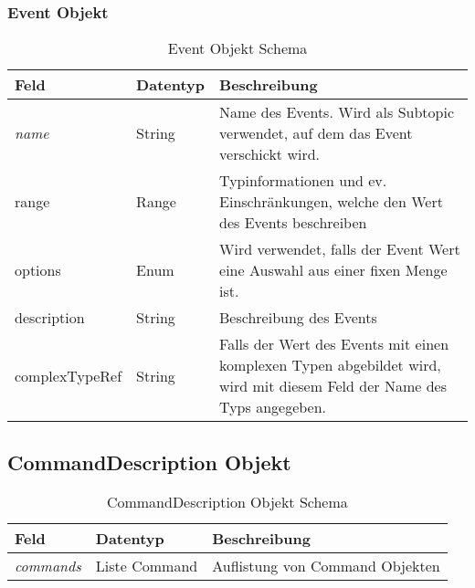 \subsubsection{Event Objekt}
\begin{table}[H]
\begin{tabularx}{\textwidth}{|l|l|X|}

 \hline \rowcolor{lightgray}
 {\bf Feld } & {\bf Datentyp } & {\bf Beschreibung } \\  \hline
 
 \textit{name}  &   String   &  Name des Events. Wird als Subtopic verwendet, auf dem das Event verschickt wird. \\ \hline
 range  &   Range   &  Typinformationen und ev. Einschränkungen, welche den Wert des Events beschreiben   \\ \hline
 options  &   Enum   &  Wird verwendet, falls der Event Wert eine Auswahl aus einer fixen Menge ist.  \\ \hline
 description  &   String   &  Beschreibung des Events  \\ \hline
 complexTypeRef  &   String   &  Falls der Wert des Events mit einen komplexen Typen abgebildet wird, wird mit diesem Feld der Name des Typs angegeben.  \\ \hline

\end{tabularx}
\caption{Event Objekt Schema}
\end{table}



\subsection{CommandDescription Objekt}
\begin{table}[H]
\begin{tabularx}{\textwidth}{|l|l|X|}

 \hline \rowcolor{lightgray}
 {\bf Feld } & {\bf Datentyp } & {\bf Beschreibung } \\  \hline
 \textit{commands}  &   Liste Command   & Auflistung von Command Objekten   \\ \hline

\end{tabularx}
\caption{CommandDescription Objekt Schema}
\end{table}


